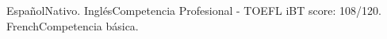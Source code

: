 \begin{cvskills}
	\cvskill
    	{Español}{Nativo.}
	\cvskill
    	{Inglés}{Competencia Profesional - TOEFL iBT score: 108/120.}
    \cvskill
    	{French}{Competencia básica.}
\end{cvskills}
